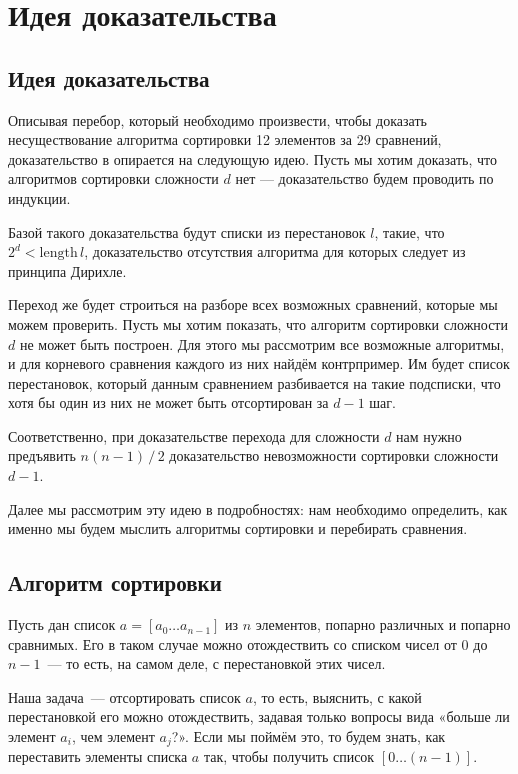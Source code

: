 \section
[Идея доказательства. Используемые понятия]
{Идея доказательства}

\subsection
[Идея доказательства по Кнуту]
{Идея доказательства}

Описывая перебор, который необходимо произвести, чтобы доказать несуществование алгоритма сортировки 12 элементов за 29 сравнений, доказательство в \cite{Knuth} опирается на следующую идею. Пусть мы хотим доказать, что алгоритмов сортировки сложности $d$ нет — доказательство будем проводить по индукции.

\abz Базой такого доказательства будут списки из перестановок $l$, такие, что $2^d < \mathrm{length}\,l$, доказательство отсутствия алгоритма для которых следует из принципа Дирихле.

\abz Переход же будет строиться на разборе всех возможных сравнений, которые мы можем проверить. Пусть мы хотим показать, что алгоритм сортировки сложности $d$ не может быть построен. Для этого мы рассмотрим все возможные алгоритмы, и для корневого сравнения каждого из них найдём контрпример. Им будет список перестановок, который данным сравнением разбивается на такие подсписки, что хотя бы один из них не может быть отсортирован за $d-1$ шаг. 

\abz Соответственно, при доказательстве перехода для сложности $d$ нам нужно предъявить $n(n-1)\,/\,2$ доказательство невозможности сортировки сложности $d-1$.

\abz Далее мы рассмотрим эту идею в подробностях: нам необходимо определить, как именно мы будем мыслить алгоритмы сортировки и перебирать сравнения.

\subsection
[Определение алгоритма сортировки]
{Алгоритм сортировки}

Пусть дан список $a = [a_0 \ldots a_{n-1}]$ из $n$ элементов, попарно различных и попарно сравнимых. Его в таком случае можно отождествить со списком чисел от $0$ до $n-1$~— то есть, на самом деле, с перестановкой этих чисел.

\abz Наша задача~— отсортировать список $a$, то есть, выяснить, с какой перестановкой его можно отождествить, задавая только вопросы вида «больше ли элемент $a_i$, чем элемент $a_j$?». Если мы поймём это, то будем знать, как переставить элементы списка $a$ так, чтобы получить список $[0\ldots(n-1)]$.


